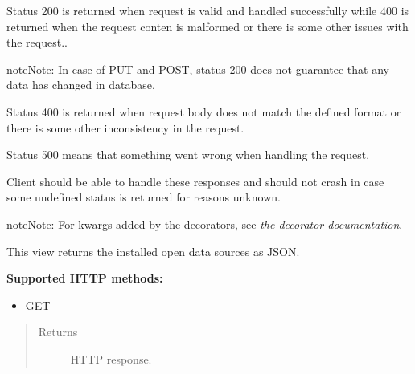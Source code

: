 \documentclass[letterpaper,10pt,english]{sphinxmanual}
\begin{document}
Status 200 is returned when request is valid and handled successfully while 400 is returned when the request conten
is malformed or there is some other issues with the request..

\begin{notice}{note}{Note:}
In case of PUT and POST, status 200 does not guarantee that any data has changed in database.
\end{notice}

Status 400 is returned when request body does not match the defined format or there is some other inconsistency in
the request.

Status 500 means that something went wrong when handling the request.

Client should be able to handle these responses and should not crash in case some undefined status is returned for
reasons unknown.

\begin{notice}{note}{Note:}
For kwargs added by the decorators, see {\hyperref[codedoc/decdoc:locdecos]{\emph{the decorator documentation}}}.
\end{notice}

\begin{fulllineitems}
\label{codedoc/locdoc:lbd_backend.LBD_REST_locationdata.views.api}
This view returns the installed open data sources as JSON.

\textbf{Supported HTTP methods:}
\begin{itemize}
\item {} 
GET

\end{itemize}
\begin{quote}\begin{description}
\item[{Returns}] \leavevmode
HTTP response.

\end{description}\end{quote}

\end{fulllineitems}

\end{document}

